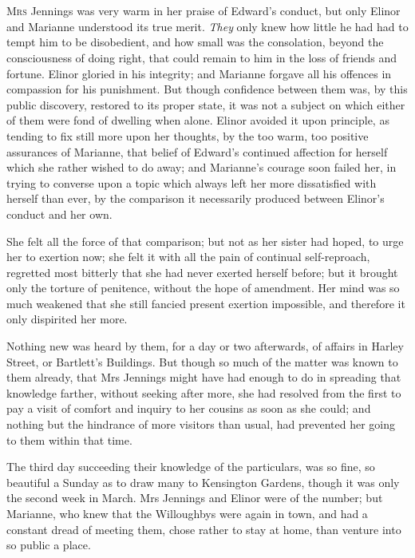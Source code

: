 \chapter[Chapter \thechapter]{}
\lettrine[lines=4,lraise=0.3]{M}{rs} Jennings was very warm in her praise of Edward’s conduct, but only Elinor and Marianne understood its true merit. \textit{They} only knew how little he had had to tempt him to be disobedient, and how small was the consolation, beyond the consciousness of doing right, that could remain to him in the loss of friends and fortune. Elinor gloried in his integrity; and Marianne forgave all his offences in compassion for his punishment. But though confidence between them was, by this public discovery, restored to its proper state, it was not a subject on which either of them were fond of dwelling when alone. Elinor avoided it upon principle, as tending to fix still more upon her thoughts, by the too warm, too positive assurances of Marianne, that belief of Edward’s continued affection for herself which she rather wished to do away; and Marianne’s courage soon failed her, in trying to converse upon a topic which always left her more dissatisfied with herself than ever, by the comparison it necessarily produced between Elinor’s conduct and her own.

She felt all the force of that comparison; but not as her sister had hoped, to urge her to exertion now; she felt it with all the pain of continual self-reproach, regretted most bitterly that she had never exerted herself before; but it brought only the torture of penitence, without the hope of amendment. Her mind was so much weakened that she still fancied present exertion impossible, and therefore it only dispirited her more.

Nothing new was heard by them, for a day or two afterwards, of affairs in Harley Street, or Bartlett’s Buildings. But though so much of the matter was known to them already, that Mrs Jennings might have had enough to do in spreading that knowledge farther, without seeking after more, she had resolved from the first to pay a visit of comfort and inquiry to her cousins as soon as she could; and nothing but the hindrance of more visitors than usual, had prevented her going to them within that time.

The third day succeeding their knowledge of the particulars, was so fine, so beautiful a Sunday as to draw many to Kensington Gardens, though it was only the second week in March. Mrs Jennings and Elinor were of the number; but Marianne, who knew that the Willoughbys were again in town, and had a constant dread of meeting them, chose rather to stay at home, than venture into so public a place.

